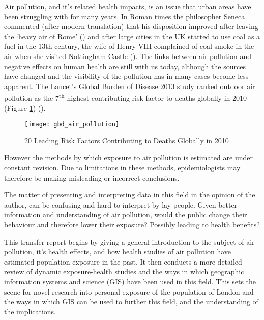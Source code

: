 Air pollution, and it's related health impacts, is an issue that urban areas have been struggling with for many years. In Roman times the philosopher Seneca commented (after modern translation) that his disposition improved after leaving the ‘heavy air of Rome’ (\cite{seneca1969}) and after large cities in the UK started to use coal as a fuel in the 13th century, the wife of Henry VIII complained of coal smoke in the air when she visited Nottingham Castle (\cite{Brimblecombe1999}). The links between air pollution and negative effects on human health are still with us today, although the sources have changed and the visibility of the pollution has in many cases become less apparent. The Lancet's Global Burden of Disease 2013 study ranked outdoor air pollution as the  7\textsuperscript{th} highest contributing risk factor to deaths globally in 2010 (Figure \ref{fig:gbd_air_pollution}) (\cite{Lim2012}).\hfill

\begin{figure}[H]
\centering
\texttt{[image: gbd\_air\_pollution]}
\caption{20 Leading Risk Factors Contributing to Deaths Globally in 2010}
\label{fig:gbd_air_pollution}
\end{figure}

However the methods by which exposure to air pollution is estimated are under constant revision. Due to limitations in these methods, epidemiologists may therefore be making misleading or incorrect conclusions.\hfill

The matter of presenting and interpreting data in this field in the opinion of the author, can be confusing and hard to interpret by lay-people. Given better information and understanding of air pollution, would the public change their behaviour and therefore lower their exposure? Possibly leading to health benefits?\hfill

This transfer report begins by giving a general introduction to the subject of air pollution, it's health effects, and how health studies of air pollution have estimated population exposure in the past. It then conducts a more detailed review of dynamic exposure-health studies and the ways in which geographic information systems and science (GIS) have been used in this field. This sets the scene for novel research into personal exposure of the population of London and the ways in which GIS can be used to further this field, and the understanding of the implications.\hfill